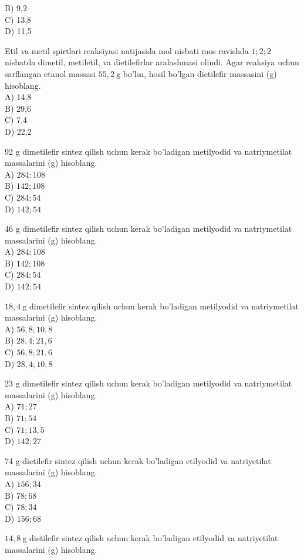 B) 9,2\\
C) 13,8\\
D) 11,5
  \item Etil va metil spirtlari reaksiyasi natijasida mol nisbati mos ravishda $1 ; 2 ; 2$ nisbatda dimetil, metiletil, va dietilefirlar aralashmasi olindi. Agar reaksiya uchun sarflangan etanol massasi $55,2 \mathrm{~g}$ bo'lsa, hosil bo'lgan dietilefir massasini (g) hisoblang.\\
A) 14,8\\
B) 29,6\\
C) 7,4\\
D) 22,2
  \item 92 g dimetilefir sintez qilish uchun kerak bo'ladigan metilyodid va natriymetilat massalarini (g) hisoblang.\\
A) $284: 108$\\
B) $142 ; 108$\\
C) $284 ; 54$\\
D) $142 ; 54$
  \item 46 g dimetilefir sintez qilish uchun kerak bo'ladigan metilyodid va natriymetilat massalarini (g) hisoblang.\\
A) $284: 108$\\
B) $142 ; 108$\\
C) $284 ; 54$\\
D) $142 ; 54$
  \item $18,4 \mathrm{~g}$ dimetilefir sintez qilish uchun kerak bo'ladigan metilyodid va natriymetilat massalarini (g) hisoblang.\\
A) $56,8 ; 10,8$\\
B) $28,4 ; 21,6$\\
C) $56,8 ; 21,6$\\
D) $28,4 ; 10,8$
  \item 23 g dimetilefir sintez qilish uchun kerak bo'ladigan metilyodid va natriymetilat massalarini (g) hisoblang.\\
A) $71 ; 27$\\
B) $71 ; 54$\\
C) $71 ; 13,5$\\
D) $142 ; 27$
  \item 74 g dietilefir sintez qilish uchun kerak bo'ladigan etilyodid va natriyetilat massalarini (g) hisoblang.\\
A) $156 ; 34$\\
B) $78 ; 68$\\
C) $78 ; 34$\\
D) $156 ; 68$
  \item $14,8 \mathrm{~g}$ dietilefir sintez qilish uchun kerak bo'ladigan etilyodid va natriyetilat massalarini (g) hisoblang.\\
